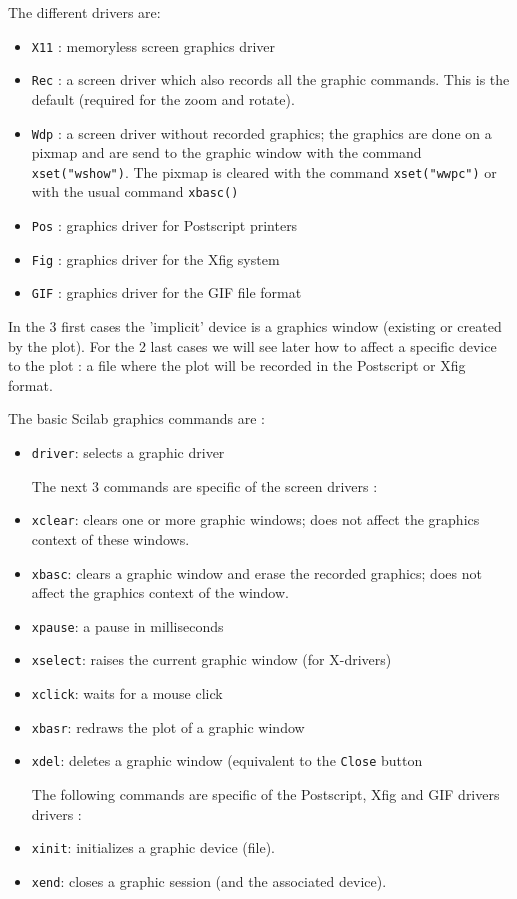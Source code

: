 \noindent The different drivers are:

%
\begin{itemize}
	\item \verb+X11+	: memoryless screen graphics driver
	\item \verb+Rec+	: a screen driver  which also
	records all the graphic commands. This is the default
	(required for the zoom and rotate).
	\item \verb+Wdp+	: a screen driver without recorded
	graphics; the graphics are done on a pixmap and are send to
	the graphic window with the command  {\tt xset("wshow")}. The 
	pixmap is cleared with the command {\tt xset("wwpc")} or with the
	usual command {\tt xbasc()}
	\item \verb+Pos+	: graphics driver for Postscript printers 
	\item \verb+Fig+	: graphics driver for the Xfig system
	\item \verb+GIF+	: graphics driver for the GIF file format
\end{itemize}
%

In the 3 first cases the 'implicit' device is a graphics window
(existing or created by the plot). For the 2 last cases we will see
later how to affect a specific device to the plot : a file where the
plot will be recorded in the Postscript or Xfig format.

The basic Scilab graphics commands are :
%
\begin{itemize}
	\item \verb+driver+: selects a graphic driver

The next 3 commands are specific of the screen drivers :

	\item \verb+xclear+: clears one or more graphic windows; does
	not affect the graphics context of these windows.
	\item \verb+xbasc+: clears a graphic window and erase the
	recorded graphics; does not affect the graphics context of  
	the window.
	\item \verb+xpause+: a pause in milliseconds
	\item \verb+xselect+: raises the current graphic window
	(for X-drivers)
	\item \verb+xclick+: waits for a mouse click
	\item \verb+xbasr+: redraws the plot of a graphic window
	\item \verb+xdel+: deletes a graphic window (equivalent to the
	{\tt Close} button

The following commands are specific of the Postscript, Xfig and GIF drivers
drivers :
	
	\item \verb+xinit+: initializes a graphic device (file).
	\item \verb+xend+: closes a graphic session (and the
	associated device).
\end{itemize}
%

